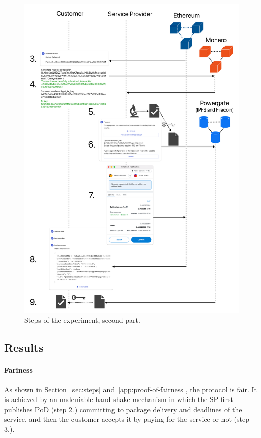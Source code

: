 \documentclass[pdftex,twocolumn,epjc3]{svjour3}
\begin{document}
{\begin{figure}
  \includegraphics[height=0.95\textheight,keepaspectratio]{anonser-experiment2.pdf}
  \caption{Steps of the experiment, second part.}\label{fig:anonser-experiment2}
\end{figure}

\fi
\subsection{Results}

\paragraph{Fariness}
As shown in Section~\ref{sec:steps} and~\ref{app:proof-of-fairness}, 
the protocol is fair. It is achieved by an undeniable hand-shake mechanism in which the SP first publishes $\mathrm{PoD}$ (step 2.) committing to package delivery and deadlines of the service, and then the customer accepts it by paying for the service or not (step 3.).

}
\end{document}

